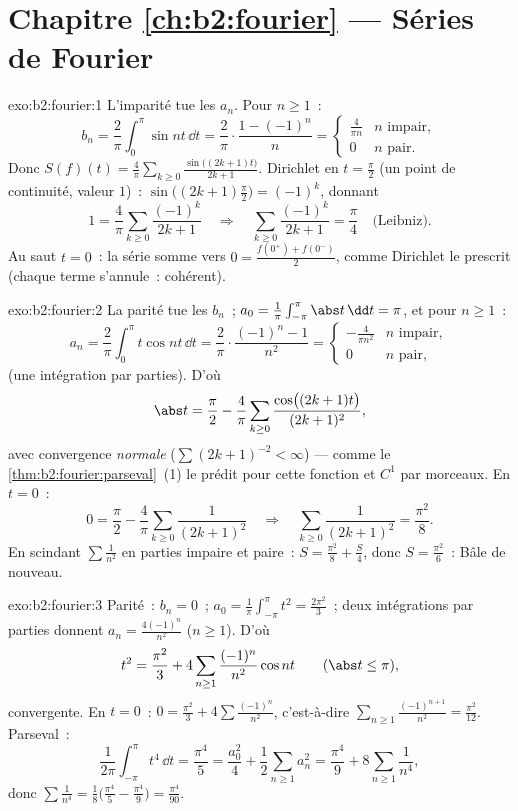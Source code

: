 \section*{Chapitre \ref{ch:b2:fourier} --- Séries de Fourier}

\begin{solution}{exo:b2:fourier:1}
L'imparité tue les $a_n$. Pour $n \geq 1$~:
\[
b_n = \frac{2}{\pi}\int_0^{\pi} \sin nt\,\dd t
= \frac{2}{\pi}\cdot\frac{1 - (-1)^n}{n}
= \begin{cases} \frac{4}{\pi n} & n \text{ impair},\\ 0 & n
\text{ pair}. \end{cases}
\]
Donc $S(f)(t) = \frac{4}{\pi}\sum_{k\geq0} \frac{\sin\bigl((2k+1)t
\bigr)}{2k+1}$. Dirichlet en $t = \frac\pi2$ (un point de continuité,
valeur $1$)~: $\sin\bigl((2k+1)\frac\pi2\bigr) = (-1)^k$, donnant
\[
1 = \frac4\pi \sum_{k\geq0}\frac{(-1)^k}{2k+1}
\quad\Longrightarrow\quad
\sum_{k\geq0}\frac{(-1)^k}{2k+1} = \frac{\pi}{4}
\quad\text{(Leibniz)}.
\]
Au saut $t = 0$~: la série somme vers $0 = \frac{f(0^+) +
f(0^-)}{2}$, comme Dirichlet le prescrit (chaque terme s'annule~:
cohérent).
\end{solution}

\begin{solution}{exo:b2:fourier:2}
La parité tue les $b_n$~; $a_0 = \frac{1}{\pi}\int_{-\pi}^\pi\abs
t\,\dd t = \pi$, et pour $n \geq 1$~:
\[
a_n = \frac{2}{\pi}\int_0^\pi t\cos nt\,\dd t
= \frac{2}{\pi}\cdot\frac{(-1)^n - 1}{n^2}
= \begin{cases} -\frac{4}{\pi n^2} & n \text{ impair},\\ 0 & n
\text{ pair}, \end{cases}
\]
(une intégration par parties). D'où
\[
\abs t = \frac{\pi}{2} - \frac{4}{\pi}\sum_{k\geq0}
\frac{\cos\bigl((2k+1)t\bigr)}{(2k+1)^2} ,
\]
avec convergence \emph{normale} ($\sum (2k+1)^{-2} < \infty$) ---
comme le \cref{thm:b2:fourier:parseval}~(1) le prédit pour cette
fonction  et $C^1$ par morceaux. En $t = 0$~:
\[
0 = \frac\pi2 - \frac4\pi\sum_{k\geq0}\frac{1}{(2k+1)^2}
\quad\Longrightarrow\quad
\sum_{k\geq0}\frac{1}{(2k+1)^2} = \frac{\pi^2}{8} .
\]
En scindant $\sum \frac{1}{n^2}$ en parties impaire et paire~: $S =
\frac{\pi^2}{8} + \frac S4$, donc $S = \frac{\pi^2}{6}$~: Bâle de
nouveau.
\end{solution}

\begin{solution}{exo:b2:fourier:3}
Parité~: $b_n = 0$~; $a_0 = \frac{1}{\pi}\int_{-\pi}^{\pi} t^2 =
\frac{2\pi^2}{3}$~; deux intégrations par parties donnent $a_n =
\frac{4(-1)^n}{n^2}$ ($n \geq 1$). D'où
\[
t^2 = \frac{\pi^2}{3} + 4\sum_{n\geq1}
\frac{(-1)^n}{n^2}\cos nt
\qquad (\abs t \leq \pi),
\]
 convergente. En $t = 0$~: $0 = \frac{\pi^2}{3} +
4\sum\frac{(-1)^n}{n^2}$, c'est-à-dire $\sum_{n\geq1}
\frac{(-1)^{n+1}}{n^2} = \frac{\pi^2}{12}$. Parseval~:
\[
\frac{1}{2\pi}\int_{-\pi}^{\pi} t^4\,\dd t = \frac{\pi^4}{5}
= \frac{a_0^2}{4} + \frac12\sum_{n\geq1} a_n^2
= \frac{\pi^4}{9} + 8\sum_{n\geq1}\frac{1}{n^4} ,
\]
donc $\sum \frac{1}{n^4} = \frac18\bigl(\frac{\pi^4}{5} -
\frac{\pi^4}{9}\bigr) = \frac{\pi^4}{90}$.
\end{solution}

